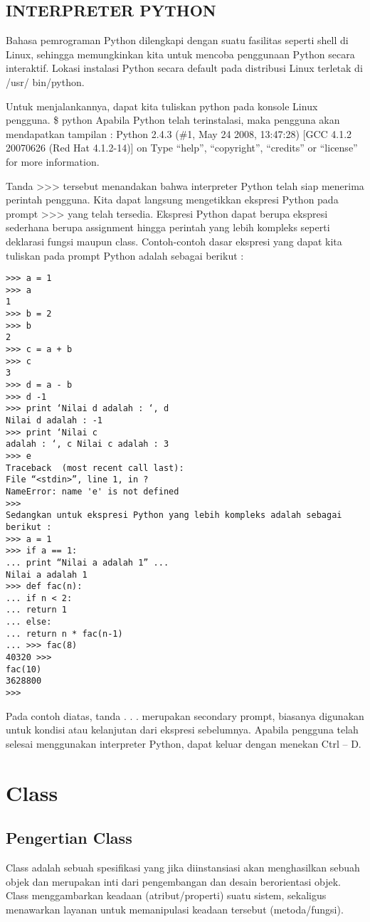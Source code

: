 \subsection{INTERPRETER PYTHON}
Bahasa pemrograman Python dilengkapi dengan suatu fasilitas seperti shell di Linux, sehingga memungkinkan kita untuk mencoba 
penggunaan Python secara interaktif. Lokasi instalasi Python secara default pada distribusi Linux terletak di /usr/ bin/python.

Untuk menjalankannya, dapat kita tuliskan python pada konsole Linux pengguna. \$ python Apabila Python telah terinstalasi, 
maka pengguna akan mendapatkan tampilan : Python 2.4.3 (\#1, May 24 2008, 13:47:28) [GCC 4.1.2 20070626 (Red Hat 4.1.2-14)] on 
Type “help”, “copyright”, “credits” or “license” for more information.

Tanda >>> tersebut menandakan bahwa interpreter Python telah siap menerima perintah pengguna. Kita dapat langsung mengetikkan 
ekspresi Python pada prompt >>> yang telah tersedia. Ekspresi Python dapat berupa ekspresi sederhana berupa assignment hingga 
perintah yang lebih kompleks seperti deklarasi fungsi maupun class. Contoh-contoh dasar ekspresi yang dapat kita tuliskan pada 
prompt Python adalah sebagai berikut : 

\begin{verbatim}
>>> a = 1 
>>> a 
1 
>>> b = 2 
>>> b 
2 
>>> c = a + b 
>>> c 
3 
>>> d = a - b 
>>> d -1
>>> print ‘Nilai d adalah : ‘, d
Nilai d adalah : -1
>>> print ‘Nilai c 
adalah : ‘, c Nilai c adalah : 3 
>>> e
Traceback  (most recent call last):
File “<stdin>”, line 1, in ? 
NameError: name 'e' is not defined
>>>
Sedangkan untuk ekspresi Python yang lebih kompleks adalah sebagai berikut : 
>>> a = 1 
>>> if a == 1:
... print “Nilai a adalah 1” ...
Nilai a adalah 1 
>>> def fac(n):
... if n < 2: 
... return 1 
... else: 
... return n * fac(n-1) 
... >>> fac(8) 
40320 >>> 
fac(10) 
3628800 
>>>
\end{verbatim}

Pada contoh diatas, tanda . . . merupakan secondary prompt, biasanya digunakan untuk kondisi atau kelanjutan dari ekspresi 
sebelumnya. Apabila pengguna telah selesai menggunakan interpreter Python, dapat keluar dengan menekan Ctrl – D.
	

\section{Class}
\subsection{Pengertian Class}
Class adalah sebuah spesifikasi yang jika diinstansiasi akan menghasilkan sebuah
objek dan merupakan inti dari pengembangan dan desain berorientasi objek. Class
menggambarkan keadaan (atribut/properti) suatu sistem, sekaligus menawarkan layanan
untuk memanipulasi keadaan tersebut (metoda/fungsi).

